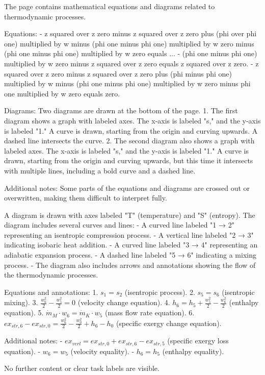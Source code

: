 The page contains mathematical equations and diagrams related to thermodynamic processes.  

Equations:  
- z squared over z zero minus z squared over z zero plus (phi over phi one) multiplied by w minus (phi one minus phi one) multiplied by w zero minus (phi one minus phi one) multiplied by w zero equals ...  
- (phi one minus phi one) multiplied by w zero minus z squared over z zero equals z squared over z zero.  
- z squared over z zero minus z squared over z zero plus (phi minus phi one) multiplied by w minus (phi one minus phi one) multiplied by w zero minus phi one multiplied by w zero equals zero.  

Diagrams:  
Two diagrams are drawn at the bottom of the page.  
1. The first diagram shows a graph with labeled axes. The x-axis is labeled "s," and the y-axis is labeled "1." A curve is drawn, starting from the origin and curving upwards. A dashed line intersects the curve.  
2. The second diagram also shows a graph with labeled axes. The x-axis is labeled "s," and the y-axis is labeled "1." A curve is drawn, starting from the origin and curving upwards, but this time it intersects with multiple lines, including a bold curve and a dashed line.  

Additional notes:  
Some parts of the equations and diagrams are crossed out or overwritten, making them difficult to interpret fully.

A diagram is drawn with axes labeled "T" (temperature) and "S" (entropy). The diagram includes several curves and lines:
- A curved line labeled "1 → 2" representing an isentropic compression process.
- A vertical line labeled "2 → 3" indicating isobaric heat addition.
- A curved line labeled "3 → 4" representing an adiabatic expansion process.
- A dashed line labeled "5 → 6" indicating a mixing process.
- The diagram also includes arrows and annotations showing the flow of the thermodynamic processes.

Equations and annotations:
1. \( s_1 = s_2 \) (isentropic process).
2. \( s_5 = s_6 \) (isentropic mixing).
3. \( \frac{w_6^2}{2} - \frac{w_5^2}{2} = 0 \) (velocity change equation).
4. \( h_6 = h_5 + \frac{w_5^2}{2} - \frac{w_6^2}{2} \) (enthalpy equation).
5. \( \dot{m}_M \cdot w_6 = \dot{m}_K \cdot w_5 \) (mass flow rate equation).
6. \( ex_{str,6} - ex_{str,0} = \frac{w_6^2}{2} - \frac{w_0^2}{2} + h_6 - h_0 \) (specific exergy change equation).

Additional notes:
- \( ex_{verl} = ex_{str,0} + ex_{str,6} - ex_{str,5} \) (specific exergy loss equation).
- \( w_6 = w_5 \) (velocity equality).
- \( h_6 = h_5 \) (enthalpy equality).

No further content or clear task labels are visible.